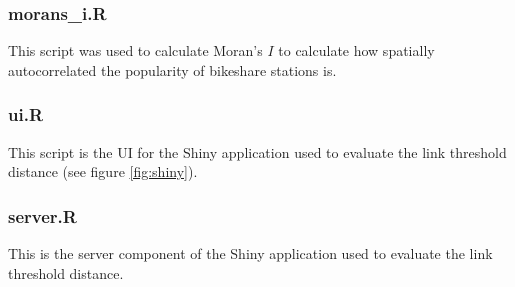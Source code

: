 \documentclass[letterpaper,11pt]{article}
\begin{document}
\subsubsection{morans\_i.R}
\label{morans_i.R}

This script was used to calculate Moran's $I$ to calculate how
spatially autocorrelated the popularity of bikeshare stations is.



\subsubsection{ui.R}
\label{ui.R}

This script is the UI for the Shiny application used to evaluate the
link threshold distance (see figure \ref{fig:shiny}).



\subsubsection{server.R}
\label{server.R}

This is the server component of the Shiny application used to evaluate
the link threshold distance.


\end{document}
